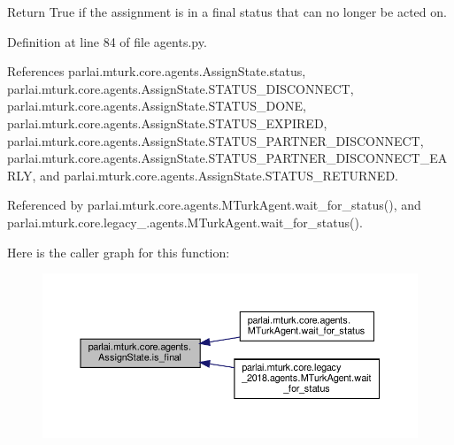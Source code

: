 \begin{DoxyVerb}Return True if the assignment is in a final status that
can no longer be acted on.
\end{DoxyVerb}
 

Definition at line 84 of file agents.\+py.



References parlai.\+mturk.\+core.\+agents.\+Assign\+State.\+status, parlai.\+mturk.\+core.\+agents.\+Assign\+State.\+S\+T\+A\+T\+U\+S\+\_\+\+D\+I\+S\+C\+O\+N\+N\+E\+CT, parlai.\+mturk.\+core.\+agents.\+Assign\+State.\+S\+T\+A\+T\+U\+S\+\_\+\+D\+O\+NE, parlai.\+mturk.\+core.\+agents.\+Assign\+State.\+S\+T\+A\+T\+U\+S\+\_\+\+E\+X\+P\+I\+R\+ED, parlai.\+mturk.\+core.\+agents.\+Assign\+State.\+S\+T\+A\+T\+U\+S\+\_\+\+P\+A\+R\+T\+N\+E\+R\+\_\+\+D\+I\+S\+C\+O\+N\+N\+E\+CT, parlai.\+mturk.\+core.\+agents.\+Assign\+State.\+S\+T\+A\+T\+U\+S\+\_\+\+P\+A\+R\+T\+N\+E\+R\+\_\+\+D\+I\+S\+C\+O\+N\+N\+E\+C\+T\+\_\+\+E\+A\+R\+LY, and parlai.\+mturk.\+core.\+agents.\+Assign\+State.\+S\+T\+A\+T\+U\+S\+\_\+\+R\+E\+T\+U\+R\+N\+ED.



Referenced by parlai.\+mturk.\+core.\+agents.\+M\+Turk\+Agent.\+wait\+\_\+for\+\_\+status(), and parlai.\+mturk.\+core.\+legacy\+\_.\+agents.\+M\+Turk\+Agent.\+wait\+\_\+for\+\_\+status().

Here is the caller graph for this function\+:
\nopagebreak
\begin{figure}[H]
\begin{center}
\leavevmode
\includegraphics[width=350pt]{classparlai_1_1mturk_1_1core_1_1agents_1_1AssignState_a95b2a76b6e8ec7e045542450ee49f971_icgraph}
\end{center}
\end{figure}
\mbox{\label{classparlai_1_1mturk_1_1core_1_1agents_1_1AssignState_a6251191f5a8d16778dc56e21564ede79}} 
